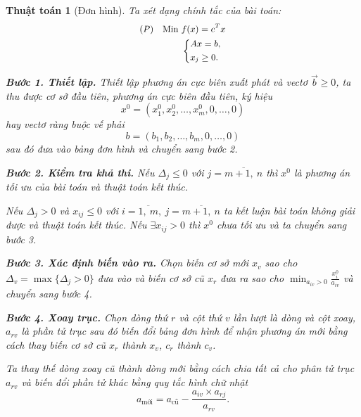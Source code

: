 \documentclass[12pt,a4paper]{report}
\newtheorem{ttoan}{Thuật toán}
\begin{document}
\begin{ttoan}[Đơn hình]
\setlength{\parindent}{4em}
Ta xét dạng chính tắc của bài toán:
    \begin{equation} \small \label{chinhtacdonhinhtt}
        \begin{split}
        (P) \quad \text{Min } & f(x) = c^Tx \\
            & \left\{
            \begin{split}
            & Ax=b, \\
            & x_j \geq 0.
            \end{split}
            \right.    
        \end{split}
    \end{equation}


\noindent \textbf{Bước 1. Thiết lập.}
Thiết lập phương án cực biên xuất phát và vectơ $\vec{b} \geq 0$, ta thu được cơ sở đầu tiên, phương án cực biên đầu tiên, ký hiệu
\begin{equation}
x^0=(x_1^0,x_2^0,\ldots,x_m^0,0,\ldots,0)
\end{equation}
hay vectơ ràng buộc vế phải
\begin{equation}
b=(b_1,b_2,\ldots,b_m,0,\ldots,0)
\end{equation}
sau đó đưa vào bảng đơn hình và chuyển sang bước 2.

\noindent \textbf{Bước 2. Kiểm tra khả thi.}
Nếu $\Delta _j\leq 0$ với $j=\overline{m+1, \: n}$ thì $x^0$ là phương án tối ưu của bài toán và thuật toán kết thúc. 

Nếu $\Delta _j > 0$ và $x_{ij}\leq 0$ với $i=\overline{1,\: m}, \: j=\overline{m+1, \: n}$ ta kết luận bài toán không giải được và thuật toán kết thúc. Nếu $\exists x_{ij} > 0$ thì $x^0$ chưa tối ưu và ta chuyển sang bước 3.

\noindent \textbf{Bước 3. Xác định biến vào ra.}
Chọn biến cơ sở mới $x_v$ sao cho $\Delta _v = \max \{\Delta _j >0 \}$ đưa vào và biến cơ sở cũ $x_r$ đưa ra sao cho $\min _{a_{iv}>0} \frac{x_i^0}{a_{iv}}$ và chuyển sang bước 4.

\noindent \textbf{Bước 4. Xoay trục.}
Chọn dòng thứ $r$ và cột thứ $v$ lần lượt là dòng và cột xoay, $a_{rv}$ là phần tử trục sau đó biến đổi bảng đơn hình để nhận phương án mới bằng cách thay biến cơ sở cũ $x_r$ thành $x_v$, $c_r$ thành $c_v$.

Ta thay thế dòng xoay cũ thành dòng mới bằng cách chia tất cả cho phân tử trục $a_{rv}$ và biến đổi phần tử khác bằng quy tắc hình chữ nhật
\begin{equation}
a_{\text{mới}} = a_{\text{cũ}} - \frac{a_{iv}\times a_{rj}}{a_{rv}}.
\end{equation}

\end{ttoan}
\end{document}
